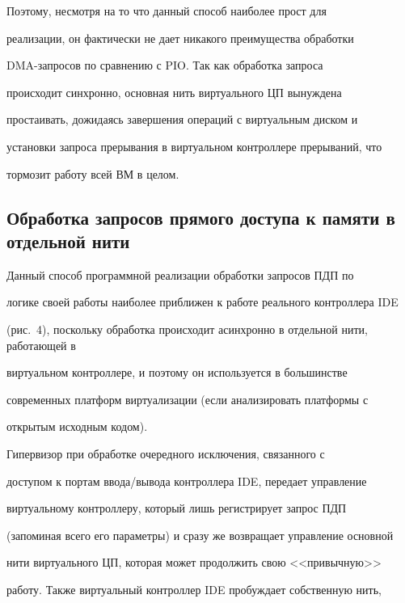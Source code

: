      


     Поэтому, несмотря на то что данный способ наиболее прост для 


реализации, он фактически не дает никакого преимущества обработки 


     DMA-запросов по сравнению с PIO. Так как обработка запроса 


происходит синхронно, основная нить виртуального ЦП вынуждена 


простаивать, дожидаясь завершения операций с виртуальным диском и 


установки запроса прерывания в виртуальном контроллере прерываний, что 


тормозит работу всей ВМ в целом.


     


\subsection{Обработка запросов прямого доступа к памяти в отдельной нити} 




    


     Данный способ программной реализации обработки запросов ПДП по 


логике своей работы наиболее приближен к работе реального контроллера IDE


(рис.~4),  поскольку обработка происходит асинхронно в отдельной нити, работающей в 


виртуальном контроллере, и поэтому он используется в большинстве 


современных платформ виртуализации (если анализировать платформы с 


открытым исходным кодом).


     


     Гипервизор при обработке очередного исключения, связанного с 


доступом к портам ввода/\!вывода контроллера IDE, передает управление 


виртуальному контроллеру, который лишь регистрирует запрос ПДП 


(запоминая всего его параметры) и сразу же возвращает управление основной 


нити виртуального ЦП, которая может продолжить свою <<привычную>> 


работу. Также виртуальный контроллер IDE пробуждает собственную нить, 


